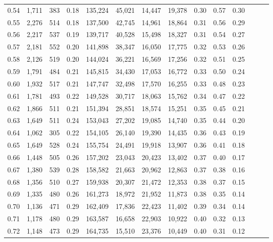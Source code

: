 \begin{tabular}{rrrrrrrrrrrrrr}
0.54 &  1,711 &  383 &  0.18 &  135,224 &   45,021 &  14,447 &  19,378 &  0.30 &  0.57 &      0.30 \\
0.55 &  2,276 &  514 &  0.18 &  137,500 &   42,745 &  14,961 &  18,864 &  0.31 &  0.56 &      0.29 \\
0.56 &  2,217 &  537 &  0.19 &  139,717 &   40,528 &  15,498 &  18,327 &  0.31 &  0.54 &      0.27 \\
0.57 &  2,181 &  552 &  0.20 &  141,898 &   38,347 &  16,050 &  17,775 &  0.32 &  0.53 &      0.26 \\
0.58 &  2,126 &  519 &  0.20 &  144,024 &   36,221 &  16,569 &  17,256 &  0.32 &  0.51 &      0.25 \\
0.59 &  1,791 &  484 &  0.21 &  145,815 &   34,430 &  17,053 &  16,772 &  0.33 &  0.50 &      0.24 \\
0.60 &  1,932 &  517 &  0.21 &  147,747 &   32,498 &  17,570 &  16,255 &  0.33 &  0.48 &      0.23 \\
0.61 &  1,781 &  493 &  0.22 &  149,528 &   30,717 &  18,063 &  15,762 &  0.34 &  0.47 &      0.22 \\
0.62 &  1,866 &  511 &  0.21 &  151,394 &   28,851 &  18,574 &  15,251 &  0.35 &  0.45 &      0.21 \\
0.63 &  1,649 &  511 &  0.24 &  153,043 &   27,202 &  19,085 &  14,740 &  0.35 &  0.44 &      0.20 \\
0.64 &  1,062 &  305 &  0.22 &  154,105 &   26,140 &  19,390 &  14,435 &  0.36 &  0.43 &      0.19 \\
0.65 &  1,649 &  528 &  0.24 &  155,754 &   24,491 &  19,918 &  13,907 &  0.36 &  0.41 &      0.18 \\
0.66 &  1,448 &  505 &  0.26 &  157,202 &   23,043 &  20,423 &  13,402 &  0.37 &  0.40 &      0.17 \\
0.67 &  1,380 &  539 &  0.28 &  158,582 &   21,663 &  20,962 &  12,863 &  0.37 &  0.38 &      0.16 \\
0.68 &  1,356 &  510 &  0.27 &  159,938 &   20,307 &  21,472 &  12,353 &  0.38 &  0.37 &      0.15 \\
0.69 &  1,335 &  480 &  0.26 &  161,273 &   18,972 &  21,952 &  11,873 &  0.38 &  0.35 &      0.14 \\
0.70 &  1,136 &  471 &  0.29 &  162,409 &   17,836 &  22,423 &  11,402 &  0.39 &  0.34 &      0.14 \\
0.71 &  1,178 &  480 &  0.29 &  163,587 &   16,658 &  22,903 &  10,922 &  0.40 &  0.32 &      0.13 \\
0.72 &  1,148 &  473 &  0.29 &  164,735 &   15,510 &  23,376 &  10,449 &  0.40 &  0.31 &      0.12 \\

\end{tabular}
